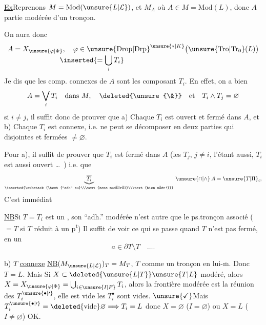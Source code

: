 \uline{Ex}\qquad Reprenons $M=\mathrm{Mod}(\unsure{L|\mathcal L})$, et $M_A$ où $A\in M=\mathrm{Mod}(L)$, donc $A$ partie modérée d'un tronçon.

On aura donc
\[
\begin{aligned}
A=X_{\unsure{\varphi|\Phi}} &,\quad
\varphi\in{\unsure{\mathrm{Drop}|\mathrm{Drp}}}^{\unsure{*|K}}
  \bigl(\unsure{\mathrm{Tro}|\mathrm{Tr}_0}(L)\bigr)\\[-0.6ex]
 &\mkern-8mu\inserted{=\bigcup_i T_i}
\end{aligned}
\]
Je dis que les comp. connexes de $A$ sont les  composant $T_i$.
En effet, on a bien 
\[
A=\bigvee_i T_i\quad\text{dans }M,\quad\deleted{\unsure{\&}}\quad\text{et}\quad T_i\wedge T_j=\varnothing
\]
si $i\ne j$, il suffit donc de prouver que a) Chaque $T_i$ est ouvert et fermé dans $A$, et b) Chaque $T_i$ est connexe, i.e. ne peut se décomposer en deux parties qui  disjointes et  fermées $\ne\varnothing$.

Pour a), il suffit de prouver que $T_i$ est fermé dans  $A$ (les $T_j$, $j\ne i$, l'étant aussi, $T_i$ est aussi ouvert \ldots\ )   i.e. que
\[
\underbrace{\overline{T_i}}_{\inserted{\substack{\text{``adh'' au}\\\text{sens modéré}\\\text{bien sûr!}}}}\,\unsure{\cap|\wedge}\, A=\unsure{T|\Pi}_{i},
\]
C'est immédiat

\uline{NB}\qquad Si $T=T_i$ est un , son ``adh.'' modérée n'est autre que le ps.tronçon  associé ($=T$ si $T$ réduit à un p\textsuperscript{t}) Il suffit de voir ce qui se passe quand $T$ n'est pas fermé, en un   
\[
a\in\partial T\setminus T\quad\ldots.
\]

b) $T$ \uline{connexe}\quad {} \uline{NB}\quad $(M_{\unsure{L|\mathcal L}})_T=M_T$,
 $T$ comme un tronçon en lui-$\overline{\text{m}}$.  Donc  $T=L$. Mais Si $X\subset\deleted{\unsure{L|T}}\unsure{T|L}$ modéré,
alors \unsure{:}  $X=X_{\unsure{\varphi|\Phi}}=\bigcup_{i\in\unsure{I|F}}T_i$, alors  la frontière modérée est la réunion des \deleted{$\unsure{\partial}$} $T_i^{\unsure{\bullet|\prime}}$,
elle est vide  les $T_i^\bullet$ sont vides. $\unsure{\checkmark}$Mais $T_i^{\unsure{\bullet|\prime}}=\deleted{\text{vide}}\varnothing\Longrightarrow T_i=L$ donc $X=\varnothing$ ($I=\varnothing$) ou $X=L$ ($I\ne\varnothing$) OK.

